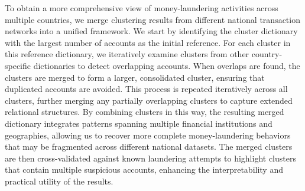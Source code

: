 \documentclass[11pt,english]{article}
\begin{document}
To obtain a more comprehensive view of money-laundering activities across multiple countries, we merge clustering results from different national transaction networks into a unified framework. We start by identifying the cluster dictionary with the largest number of accounts as the initial reference. For each cluster in this reference dictionary, we iteratively examine clusters from other country-specific dictionaries to detect overlapping accounts. When overlaps are found, the clusters are merged to form a larger, consolidated cluster, ensuring that duplicated accounts are avoided. This process is repeated iteratively across all clusters, further merging any partially overlapping clusters to capture extended relational structures. By combining clusters in this way, the resulting merged dictionary integrates patterns spanning multiple financial institutions and geographies, allowing us to recover more complete money-laundering behaviors that may be fragmented across different national datasets. The merged clusters are then cross-validated against known laundering attempts to highlight clusters that contain multiple suspicious accounts, enhancing the interpretability and practical utility of the results.
\end{document}
